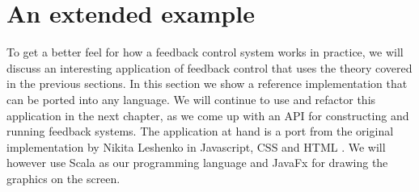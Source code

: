\section{An extended example}
To get a better feel for how a feedback control system works in practice, we will discuss an interesting application of feedback control that uses the theory covered in the previous sections. In this section we show a reference implementation that can be ported into any language. We will continue to use and refactor this application in the next chapter, as we come up with an API for constructing and running feedback systems. The application at hand is a port from the original implementation by Nikita Leshenko in Javascript, CSS and HTML \cite{nikital-balltracker}. We will however use Scala as our programming language and JavaFx for drawing the graphics on the screen.